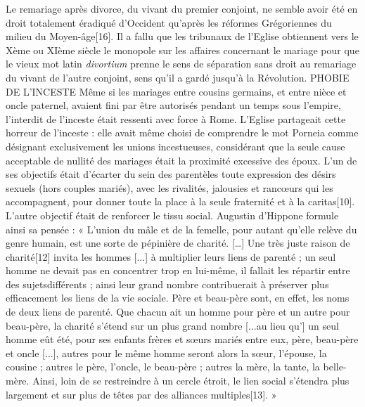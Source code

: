  Le remariage après divorce, du vivant du premier conjoint, ne semble avoir été en droit totalement éradiqué d'Occident qu'après les réformes Grégoriennes du milieu du Moyen-âge[16]. Il a fallu que les tribunaux de l'Eglise obtiennent vers le Xème ou XIème siècle le monopole sur les affaires concernant le mariage pour que le vieux mot latin \emph{divortium} prenne le sens de séparation sans droit au remariage du vivant de l'autre conjoint, sens qu'il a gardé jusqu'à la Révolution. 
PHOBIE DE L'INCESTE
 Même si les mariages entre cousins germains, et entre nièce et oncle paternel, avaient fini par être autorisés pendant un temps sous l'empire, l'interdit de l'inceste était ressenti avec force à Rome. L'Eglise partageait cette horreur de l'inceste : elle avait même choisi de comprendre le mot Porneia comme désignant exclusivement les unions incestueuses, considérant que la seule cause acceptable de nullité des mariages était la proximité excessive des époux. L'un de ses objectifs était d'écarter du sein des parentèles toute expression des désirs sexuels (hors couples mariés), avec les rivalités, jalousies et rancœurs qui les accompagnent, pour donner toute la place à la seule fraternité et à la caritas[10]. L'autre objectif était de renforcer le tissu social. Augustin d'Hippone formule ainsi sa pensée : « L'union du mâle et de la femelle, pour autant qu'elle relève du genre humain, est une sorte de pépinière de charité. […] Une très juste raison de charité[12] invita les hommes [...] à multiplier leurs liens de parenté ; un seul homme ne devait pas en concentrer trop en lui-même, il fallait les répartir entre des sujets\emph{}différents ; ainsi leur grand nombre contribuerait à préserver plus efficacement les liens de la vie sociale. Père et beau-père sont, en effet, les noms de deux liens de parenté. Que chacun ait un homme pour père et un autre pour beau-père, la charité s'étend sur un plus grand nombre [...au lieu qu'] un seul homme eût été, pour ses enfants frères et sœurs mariés entre eux, père, beau-père et oncle [...], autres pour le même homme seront alors la sœur, l'épouse, la cousine ; autres le père, l'oncle, le beau-père ; autres la mère, la tante, la belle-mère. Ainsi, loin de se restreindre à un cercle étroit, le lien social s'étendra plus largement et sur plus de têtes par des alliances multiples[13]. »
